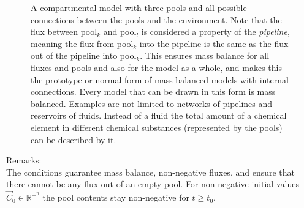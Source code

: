 \documentclass[a4paper]{article}
\DeclareRobustCommand{\Rbb}[1]{
		\mathbb{R}^{+^{#1}}
}
\DeclareRobustCommand{\Rbb}[1]{
		\mathbb{R}^{+^{#1}}
}
\begin{document}
\begin{appendices}
\begin{figure}[h]
	\caption{
     	\label{fig:3PoolsFeedBackWaterM}
	A compartmental model with three pools and all possible
	connections between the pools and the environment.  
	Note that the flux between pool$_k$ and pool$_l$ is considered a property of the
	\emph{pipeline}, meaning the flux from pool$_k$ into the pipeline is the
	same as the flux out of the pipeline into pool$_k$.  
	This ensures mass balance for all fluxes and pools and also for the model as a whole, and
	makes this the prototype or normal form of mass balanced models with
	internal connections.  
	Every model that can be drawn in this
	form is mass balanced.  Examples are not limited to networks of
	pipelines and reservoirs of fluids. Instead of a fluid the total amount
	of a chemical element in different chemical substances (represented by
	the pools) can be described by it.
	}
\end{figure}
Remarks:\\
The conditions guarantee mass balance, non-negative fluxes,
and ensure that there cannot be any flux out of an empty pool.
For non-negative initial values $\vec{C}_0\in \Rbb{n}$ the pool contents stay non-negative for  $t\ge t_0$.
\end{appendices}
\end{document}
